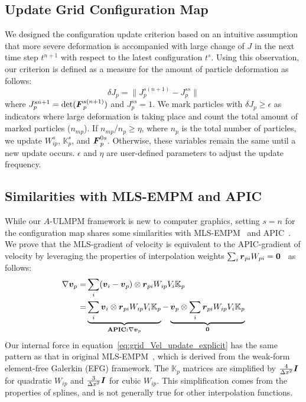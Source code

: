 \subsection{Update Grid Configuration Map}\label{sec:update_configuration}
We designed the configuration update criterion based on an intuitive assumption that more severe deformation is accompanied with large change of $J$ in the next time step $t^{n+1}$ with respect to the latest configuration $t^s$. 
Using this observation, our criterion is defined as a measure for the amount of particle deformation as follows:
\begin{equation}
    \delta J_p=\|J_p^{s(n+1)}-J_p^{ss}\|
    \label{eq:update_conf}
\end{equation}
where $J_p^{s{n+1}}=\text{det}(\boldsymbol{F}_p^{s(n+1)})$ and $J_p^{ss}=1$. 
We mark particles with $\delta J_p\geq \epsilon$ as indicators where large deformation is taking place and count the total amount of marked particles ($n_{mp}$). If $n_{mp}/n_p\geq \eta$, where $n_p$ is the total number of particles, we update $W_{ip}^s$, $\mathbb{K}_p^s$, and $\boldsymbol{F}_p^{0s}$. Otherwise, these variables remain the same until a new update occurs. $\epsilon$ and $\eta$ are user-defined parameters to adjust the update frequency. 
\subsection{Similarities with  MLS-EMPM and APIC}
While our $A$-ULMPM framework is new to computer graphics, setting $s=n$ for the configuration map shares some similarities with MLS-EMPM~\cite{Hu:2018:Moving} and APIC~\cite{jiang:2015:apic}. 
We prove that the MLS-gradient of velocity is equivalent to the APIC-gradient of velocity by leveraging the properties of interpolation weights $\sum_i \boldsymbol{r}_{pi} W_{pi} =\boldsymbol{0}$~\cite{Jiang:2017:APIC} as follows:
\begin{eqnarray}
\begin{split}
    \nabla\boldsymbol{v}_p=&\sum_i(\boldsymbol{v}_i-\boldsymbol{v}_p)\otimes\boldsymbol{r}_{pi} W_{ip}V_i
    \mathbb{K}_p\\
    =&\underbrace{\sum_i\boldsymbol{v}_i\otimes\boldsymbol{r}_{pi} W_{ip}V_i
    \mathbb{K}_p}_{\textbf{APIC:} \nabla \boldsymbol{v}_p}-\underbrace{\boldsymbol{v}_p\otimes\sum_i\boldsymbol{r}_{pi} W_{ip}V_i
    \mathbb{K}_p}_{\boldsymbol{0}}
\end{split}
\end{eqnarray}
Our internal force in equation~\eqref{eq:grid_Vel_update_explicit} has the same pattern as that in original MLS-EMPM~\cite{Hu:2018:Moving}, which is derived from the weak-form element-free Galerkin (EFG) framework. The $\mathbb{K}_p$ matrices are simplified by $\frac{4}{\Delta x^2}\boldsymbol{I}$ for quadratic $W_{ip}$ and $\frac{3}{\Delta x^2}\boldsymbol{I}$ for cubic $W_{ip}$. This simplification comes from the properties of splines, and is not generally true for other interpolation functions. 
\vspace{-4mm}


